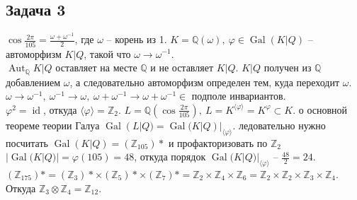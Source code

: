 \subsection*{Задача 3}
	$\cos \frac{2\pi}{105} = \frac{\omega + \omega^{-1}}{2}$, где $\omega$ -- корень из 1. $K = \mathbb{Q}(\omega),\ \varphi \in \operatorname{Gal}(K|Q)$ -- автоморфизм $K|Q$, такой что $\omega \to \omega^{-1}$.\\
	$\operatorname{Aut}_{\mathbb{Q}}K|Q$ оставляет на месте $\mathbb{Q}$ и не оставляет $K|Q$. $K|Q$ получен из $\mathbb{Q}$ добавлением $\omega$, а следовательно автоморфизм определен тем, куда переходит $\omega$. $\omega \to \omega^{-1},\ \omega^{-1} \to \omega,\ \omega + \omega^{-1} \to \omega + \omega^{-1} \in$ подполе инвариантов.\\
	$\varphi^{2} = \operatorname{id}$, откуда $\langle \varphi \rangle = \mathbb{Z}_2$. $L = \mathbb{Q}(\cos \frac{2\pi}{105}),\ L = K^{\langle \varphi \rangle} = K^{\varphi} \subset K$. о основной теореме теории Галуа $\operatorname{Gal}(L|Q) = \operatorname{Gal}(K|Q)|_{\langle \varphi \rangle}$. ледовательно нужно посчитать $\operatorname{Gal}(K|Q) = (\mathbb{Z}_{105})*$ и профакторизовать по $\mathbb{Z}_{2}$\\
	$|\operatorname{Gal}(K|Q)| = \varphi(105) = 48$, откуда порядок $\operatorname{Gal}(K|Q)|_{\langle \varphi \rangle}$ -- $\frac{48}{2} = 24$. $(\mathbb{Z}_{175})* = (\mathbb{Z}_{3})* \times (\mathbb{Z}_{5})* \times (\mathbb{Z}_{7})* = \mathbb{Z}_{2} \times \mathbb{Z}_{4} \times \mathbb{Z}_{6} = \mathbb{Z}_{2} \times \mathbb{Z}_{2} \times \mathbb{Z}_{3} \times \mathbb{Z}_{4}$. Откуда $\mathbb{Z}_{3} \otimes \mathbb{Z}_{4} = \mathbb{Z}_{12}$.
\begin{comment}
	Заметим, что $\cos \frac{2\pi}{105} = \frac{e^{\frac{2\pi i}{105}} + e^{-\frac{2\pi i}{105}}}{2}$ и $\mathbb{Q}[e^{\frac{2\pi i}{105}}] = \mathbb{Q}[\sqrt[105]{1}]$. По теореме из лекции $\deg L_{105}|_{\mathbb{Q}} = \varphi(105) = 48$ и $\operatorname{Gal} L_{105}|_{\mathbb{Q}} \simeq (\mathbb{Z}_{105})* \simeq (\mathbb{Z}_{3})* \times (\mathbb{Z}_{5})* \times (\mathbb{Z}_{7})* = \mathbb{Z}_{2} \times \mathbb{Z}_{4} \times \mathbb{Z}_{6} = \mathbb{Z}_{2} \times \mathbb{Z}_{2} \times \mathbb{Z}_{3} \times \mathbb{Z}_{4}$\\
	$\deg(\mathbb{Q}[\cos(e^{\frac{2\pi i}{105}})]|_{\mathbb{Q}}) = 4$, цикл расширрения степени 4. $\cos(e^{\frac{2\pi i}{105}})$ -- корень уравнения $x^2 - 2\cos(\frac{2\pi}{105})x + 1 = 0$, откуда $x = \frac{2\cos(\alpha) \pm 2i\sin(\alpha)}{2} = \cos(\alpha) \pm i \sin(\alpha)$, степень расширения 2, откуда $\deg(\mathbb{Q}(\cos(\frac{2\pi}{105}))|_{\mathbb{Q}}) = 2$, по основной теореме Галуа $\mathbb{Q}(\cos(\frac{2\pi}{105}))$ -- расширение Галуа и группа $\mathbb{Z}_2$
\end{comment}